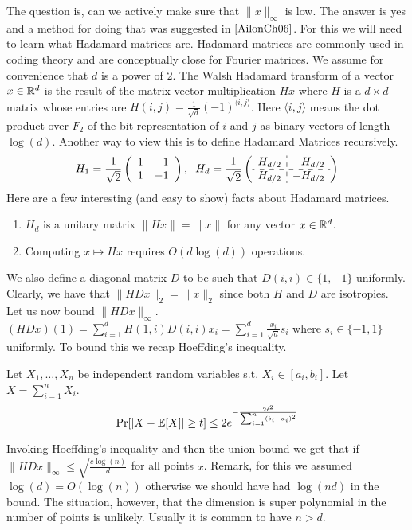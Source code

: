 \documentclass{article}
\begin{document}
The question is, can we actively make sure that $\|x\|_\infty$ is low.
The answer is yes and a method for doing that was suggested in $\cite{AilonCh06}$.
For this we will need to learn what Hadamard matrices are.
Hadamard matrices are commonly used in coding theory and are conceptually
close for Fourier matrices. We assume for convenience that $d$ is a power of $2$.
The Walsh Hadamard transform of a vector $x \in {\mathbb{R}}^{d}$ is the
result of the matrix-vector multiplication $Hx$ where $H$ is a $d
\times d$ matrix whose entries are $H(i,j) = \frac{1}{\sqrt{d}}(-1)^{\langle
i,j\rangle}$. Here ${\langle i,j\rangle}$ means the dot product over
$F_2$ of the bit representation of $i$ and $j$ as binary vectors of
length $\log(d)$.
Another way to view this is to define Hadamard Matrices recursively.
\begin{equation*} %
H_{1} = \frac{1}{\sqrt{2}}\left(
          \begin{array}{rr}
            1 & 1 \\
            1 & -1\\
          \end{array}
        \right)
,\;\;
        H_{d} = \frac{1}{\sqrt{2}}\left(
          \begin{array}{r:r}
            H_{d/2} & H_{d/2} \\ \hdashline
            H_{d/2} & -H_{d/2}\\
          \end{array}
        \right)
\end{equation*} %
Here are a few interesting (and easy to show) facts about Hadamard matrices.
\begin{enumerate}
\item $H_d$ is a unitary matrix $\|Hx\| = \|x\|$ for any vector $x\in {\mathbb{R}}^d$.
\item Computing $x \mapsto Hx$ requires $O(d\log(d))$ operations.
\end{enumerate}


We also define a diagonal matrix $D$ to be such that $D(i,i) \in \{1,-1\}$ uniformly.
Clearly, we have that $\|HDx\|_2 = \|x\|_2$ since both $H$ and $D$ are isotropies.
Let us now bound $\|HDx\|_\infty$.
$(HDx)(1) = \sum_{i=1}^{d}H(1,i)D(i,i) x_i = \sum_{i=1}^{d}\frac{x_i}{\sqrt{d}}s_i$ where $s_i \in \{-1,1\}$ uniformly.
To bound this we recap Hoeffding's inequality.
\begin{fact}
Let $X_1,\ldots,X_n$ be independent random variables s.t. $X_i \in [a_i,b_i]$.
Let $X = \sum_{i=1}^{n} X_i$.
\begin{equation}
\Pr[|X - {\mathbb E}[X]| \ge t] \le 2e^{-\frac{2 t^2}{\sum_{i=1}^{n} (b_i -a_i)^2}}
\end{equation}
\end{fact}
Invoking Hoeffding's inequality and then the union bound we get that if $\|HDx\|_\infty \le \sqrt{\frac{c \log(n)}{d}}$ for all points $x$.
Remark, for this we assumed $\log(d) = O(\log(n))$ otherwise we should have had $\log(nd)$ in the bound. 
The situation, however, that the dimension is super polynomial in the number of points is unlikely. 
Usually it is common to have $n > d$.
\end{document}
